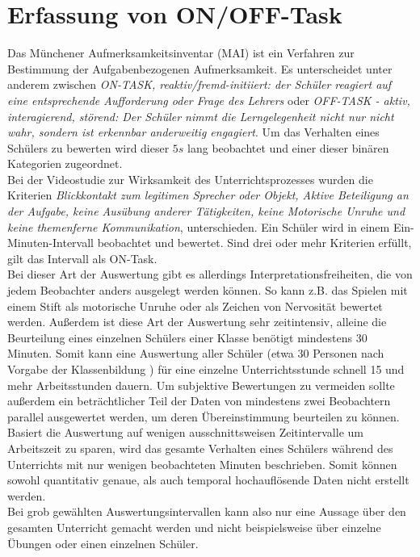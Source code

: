 \section{Erfassung von ON/OFF-Task}
\label{on_off_Task}
\glqq Das Münchener Aufmerksamkeitsinventar (MAI)\grqq \cite{MAI_Verhaltensbeobachtung} ist ein Verfahren zur Bestimmung der Aufgabenbezogenen Aufmerksamkeit. Es unterscheidet unter anderem zwischen \textit{\glqq ON-TASK, reaktiv/fremd-initiiert: der Schüler reagiert auf eine entsprechende Aufforderung oder Frage des Lehrers\grqq} oder \textit{\glqq OFF-TASK - aktiv, interagierend, störend: Der Schüler nimmt die Lerngelegenheit nicht nur nicht wahr, sondern ist erkennbar anderweitig engagiert\grqq}. Um das Verhalten eines Schülers zu bewerten wird dieser $5s$ lang beobachtet und einer dieser binären Kategorien zugeordnet.\\
Bei der \glqq Videostudie zur Wirksamkeit des Unterrichtsprozesses \grqq \cite{aufmerksamkeit_Studie} wurden die Kriterien \textit{\glqq Blickkontakt zum legitimen Sprecher oder Objekt, Aktive Beteiligung an der Aufgabe, keine Ausübung anderer Tätigkeiten, keine Motorische Unruhe und keine themenferne Kommunikation\grqq}, unterschieden. Ein Schüler wird in einem Ein-Minuten-Intervall beobachtet und bewertet. Sind drei oder mehr Kriterien erfüllt, gilt das Intervall als ON-Task.\\
Bei dieser Art der Auswertung gibt es allerdings Interpretationsfreiheiten, die von jedem Beobachter anders ausgelegt werden können. So kann z.B. das Spielen mit einem Stift als motorische Unruhe oder als Zeichen von Nervosität bewertet werden. Außerdem ist diese Art der Auswertung sehr zeitintensiv, alleine die Beurteilung eines einzelnen Schülers einer Klasse benötigt mindestens 30 Minuten. Somit kann eine Auswertung aller Schüler (etwa 30 Personen nach Vorgabe der Klassenbildung \cite{klassenteiler}) für eine einzelne Unterrichtsstunde schnell 15 und mehr Arbeitsstunden dauern.
\newpage
Um subjektive Bewertungen zu vermeiden sollte außerdem ein beträchtlicher Teil der Daten von mindestens zwei Beobachtern parallel ausgewertet werden, um deren Übereinstimmung beurteilen zu können.\\
Basiert die Auswertung auf wenigen ausschnittsweisen Zeitintervalle um Arbeitszeit zu sparen, wird das gesamte Verhalten eines Schülers während des Unterrichts mit nur wenigen beobachteten Minuten beschrieben. Somit können sowohl quantitativ genaue, als auch temporal hochauflösende Daten nicht erstellt werden.\\
Bei grob gewählten Auswertungsintervallen kann also nur eine Aussage über den gesamten Unterricht gemacht werden und nicht beispielsweise über einzelne Übungen oder einen einzelnen Schüler.